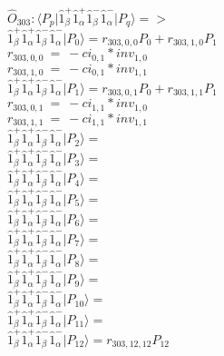 \documentclass[14pt]{article}
\begin{document}
    $\hat{O}_{303}:  \langle{P_p}\vert \hat{1}_{\beta}^{+}\hat{1}_{\alpha}^{+}\hat{1}_{\beta}^{-}\hat{1}_{\alpha}^{-} \vert{P_q}\rangle => $ \\ 
    $ \hat{1}_{\beta}^{+}\hat{1}_{\alpha}^{+}\hat{1}_{\beta}^{-}\hat{1}_{\alpha}^{-} \vert{P_{0}}\rangle = {r}_{303,0,0}P_{0}+{r}_{303,1,0}P_{1} $ \\ 
    ${r}_{303,0,0}\ =\ -{ci}_{0,1}*{inv}_{1,0} $ \\ 
    ${r}_{303,1,0}\ =\ -{ci}_{0,1}*{inv}_{1,1} $ \\ 
    $ \hat{1}_{\beta}^{+}\hat{1}_{\alpha}^{+}\hat{1}_{\beta}^{-}\hat{1}_{\alpha}^{-} \vert{P_{1}}\rangle = {r}_{303,0,1}P_{0}+{r}_{303,1,1}P_{1} $ \\ 
    ${r}_{303,0,1}\ =\ -{ci}_{1,1}*{inv}_{1,0} $ \\ 
    ${r}_{303,1,1}\ =\ -{ci}_{1,1}*{inv}_{1,1} $ \\ 
    $ \hat{1}_{\beta}^{+}\hat{1}_{\alpha}^{+}\hat{1}_{\beta}^{-}\hat{1}_{\alpha}^{-} \vert{P_{2}}\rangle =  $ \\ 
    $ \hat{1}_{\beta}^{+}\hat{1}_{\alpha}^{+}\hat{1}_{\beta}^{-}\hat{1}_{\alpha}^{-} \vert{P_{3}}\rangle =  $ \\ 
    $ \hat{1}_{\beta}^{+}\hat{1}_{\alpha}^{+}\hat{1}_{\beta}^{-}\hat{1}_{\alpha}^{-} \vert{P_{4}}\rangle =  $ \\ 
    $ \hat{1}_{\beta}^{+}\hat{1}_{\alpha}^{+}\hat{1}_{\beta}^{-}\hat{1}_{\alpha}^{-} \vert{P_{5}}\rangle =  $ \\ 
    $ \hat{1}_{\beta}^{+}\hat{1}_{\alpha}^{+}\hat{1}_{\beta}^{-}\hat{1}_{\alpha}^{-} \vert{P_{6}}\rangle =  $ \\ 
    $ \hat{1}_{\beta}^{+}\hat{1}_{\alpha}^{+}\hat{1}_{\beta}^{-}\hat{1}_{\alpha}^{-} \vert{P_{7}}\rangle =  $ \\ 
    $ \hat{1}_{\beta}^{+}\hat{1}_{\alpha}^{+}\hat{1}_{\beta}^{-}\hat{1}_{\alpha}^{-} \vert{P_{8}}\rangle =  $ \\ 
    $ \hat{1}_{\beta}^{+}\hat{1}_{\alpha}^{+}\hat{1}_{\beta}^{-}\hat{1}_{\alpha}^{-} \vert{P_{9}}\rangle =  $ \\ 
    $ \hat{1}_{\beta}^{+}\hat{1}_{\alpha}^{+}\hat{1}_{\beta}^{-}\hat{1}_{\alpha}^{-} \vert{P_{10}}\rangle =  $ \\ 
    $ \hat{1}_{\beta}^{+}\hat{1}_{\alpha}^{+}\hat{1}_{\beta}^{-}\hat{1}_{\alpha}^{-} \vert{P_{11}}\rangle =  $ \\ 
    $ \hat{1}_{\beta}^{+}\hat{1}_{\alpha}^{+}\hat{1}_{\beta}^{-}\hat{1}_{\alpha}^{-} \vert{P_{12}}\rangle = {r}_{303,12,12}P_{12} $ \\ 
\end{document}
